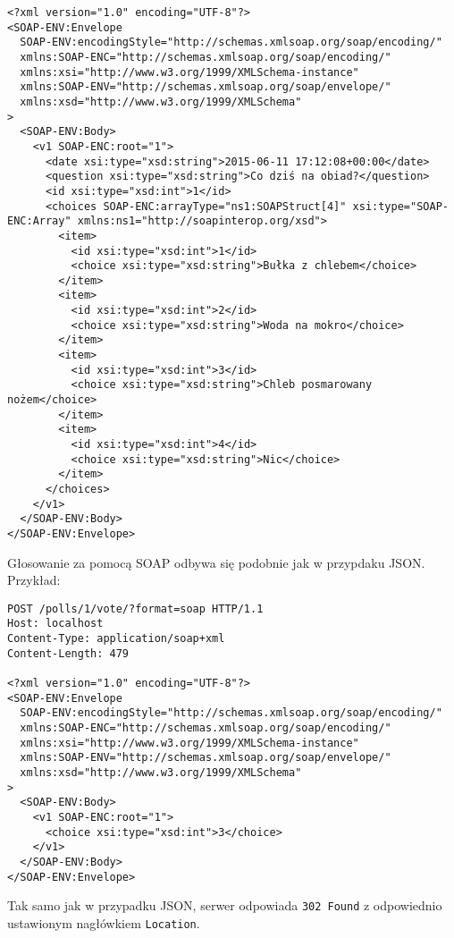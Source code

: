\documentclass[12pt,a4paper]{article}
\begin{document}
\begin{verbatim}
<?xml version="1.0" encoding="UTF-8"?>
<SOAP-ENV:Envelope
  SOAP-ENV:encodingStyle="http://schemas.xmlsoap.org/soap/encoding/"
  xmlns:SOAP-ENC="http://schemas.xmlsoap.org/soap/encoding/"
  xmlns:xsi="http://www.w3.org/1999/XMLSchema-instance"
  xmlns:SOAP-ENV="http://schemas.xmlsoap.org/soap/envelope/"
  xmlns:xsd="http://www.w3.org/1999/XMLSchema"
>
  <SOAP-ENV:Body>
    <v1 SOAP-ENC:root="1">
      <date xsi:type="xsd:string">2015-06-11 17:12:08+00:00</date>
      <question xsi:type="xsd:string">Co dziś na obiad?</question>
      <id xsi:type="xsd:int">1</id>
      <choices SOAP-ENC:arrayType="ns1:SOAPStruct[4]" xsi:type="SOAP-ENC:Array" xmlns:ns1="http://soapinterop.org/xsd">
        <item>
          <id xsi:type="xsd:int">1</id>
          <choice xsi:type="xsd:string">Bułka z chlebem</choice>
        </item>
        <item>
          <id xsi:type="xsd:int">2</id>
          <choice xsi:type="xsd:string">Woda na mokro</choice>
        </item>
        <item>
          <id xsi:type="xsd:int">3</id>
          <choice xsi:type="xsd:string">Chleb posmarowany nożem</choice>
        </item>
        <item>
          <id xsi:type="xsd:int">4</id>
          <choice xsi:type="xsd:string">Nic</choice>
        </item>
      </choices>
    </v1>
  </SOAP-ENV:Body>
</SOAP-ENV:Envelope>
\end{verbatim}
Głosowanie za pomocą SOAP odbywa się podobnie jak w przypdaku JSON. Przykład:
\begin{verbatim}
POST /polls/1/vote/?format=soap HTTP/1.1
Host: localhost
Content-Type: application/soap+xml
Content-Length: 479

<?xml version="1.0" encoding="UTF-8"?>
<SOAP-ENV:Envelope
  SOAP-ENV:encodingStyle="http://schemas.xmlsoap.org/soap/encoding/"
  xmlns:SOAP-ENC="http://schemas.xmlsoap.org/soap/encoding/"
  xmlns:xsi="http://www.w3.org/1999/XMLSchema-instance"
  xmlns:SOAP-ENV="http://schemas.xmlsoap.org/soap/envelope/"
  xmlns:xsd="http://www.w3.org/1999/XMLSchema"
>
  <SOAP-ENV:Body>
    <v1 SOAP-ENC:root="1">
      <choice xsi:type="xsd:int">3</choice>
    </v1>
  </SOAP-ENV:Body>
</SOAP-ENV:Envelope>
\end{verbatim}
Tak samo jak w przypadku JSON, serwer odpowiada \texttt{302 Found} z odpowiednio ustawionym nagłówkiem \texttt{Location}.
\end{document}
